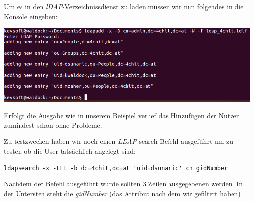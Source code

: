 Um es in den \textit{lDAP}-Verzeichnissdienst zu laden müssen wir nun folgendes in die Konsole eingeben: 
\begin{center}
	\includegraphics[width=1.0\linewidth]{images/a3_ldapadd.PNG}
\end{center}

Erfolgt die Ausgabe wie in unserem Beispiel verlief das Hinzufügen der Nutzer zumindest schon ohne Probleme.

Zu testzwecken haben wir noch einen \textit{LDAP}-search Befehl ausgeführt um zu testen ob die User tatsächlich angelegt sind:

\verb|ldapsearch -x -LLL -b dc=4chit,dc=at 'uid=dsunaric' cn gidNumber|

Nachdem der Befehl ausgeführt wurde sollten 3 Zeilen ausgegebenen werden. In der Untersten steht die \textit{gidNumber} (das Attribut nach dem wir gefiltert haben)